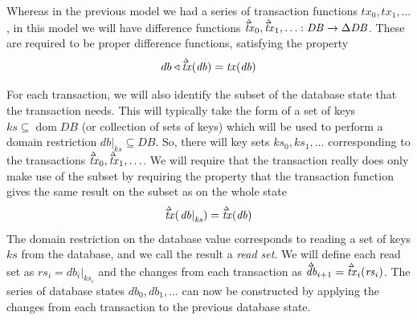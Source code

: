 \documentclass[11pt,a4paper]{article}
\DeclareMathOperator{\dom}{dom}
\newcommand\restrict[2]{\left.#1\right|_{#2}}
\newcommand\deltavar[1]{\accentset{\Delta}{#1}}
\begin{document}
Whereas in the previous model we had a series of transaction functions
$\mathit{tx}_0, \mathit{tx}_1, \ldots$, in this model we will have difference
functions
$\deltavar{\mathit{tx}}_0, \deltavar{\mathit{tx}}_1, \ldots : \mathit{DB} \to \Delta\mathit{DB}$. These are required to be proper difference functions, satisfying the property
\begin{equation}
\label{eq:diff-fun}
db \triangleleft \deltavar{\mathit{tx}}(\mathit{db}) = \mathit{tx}(\mathit{db})
\end{equation}

For each transaction, we will also identify the subset of the database state that
the transaction needs. This will typically take the form of a set of keys
$\mathit{ks} \subseteq \dom{\mathit{DB}}$ (or collection of sets of keys) which will be used to
perform a domain restriction $\restrict{\mathit{db}}{\mathit{ks}} \subseteq \mathit{DB}$.
So, there will key sets $\mathit{ks}_0, \mathit{ks}_1, \ldots$ corresponding to
the transactions $\deltavar{\mathit{tx}}_0, \deltavar{\mathit{tx}}_1, \ldots$.
We will require that the transaction really does only make use of the subset
by requiring the property that the transaction function gives the same result
on the subset as on the whole state
\begin{equation}
\label{eq:tx-within-keyset}
  \deltavar{\mathit{tx}}(\restrict{\mathit{db}}{\mathit{ks}}) = \deltavar{\mathit{tx}}(\mathit{db})
\end{equation}
The domain restriction on the database value corresponds to reading a set of
keys $\mathit{ks}$ from the database, and we call the result a \emph{read set}.
We will define each read set as
$\mathit{rs}_i = \restrict{\mathit{db}_i}{\mathit{ks}_i}$
and the changes from each transaction as
$\deltavar{\mathit{db}}_{i+1} = \deltavar{\mathit{tx}}_i(\mathit{rs}_i)$.
The series of database states
$\mathit{db}_0, \mathit{db}_1, \ldots$ can now be constructed by applying the changes from each
transaction to the previous database state.
\end{document}
